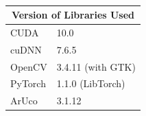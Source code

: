 \begin{table}[h]
    \renewcommand*{\arraystretch}{1.6}
    \centering
    \begin{tabularx}{\textwidth}{Xl}
        \multicolumn{2}{c}{\Large{Version of Libraries Used}} \\
        \toprule
        CUDA    & 10.0                                        \\
        \midrule
        cuDNN   & 7.6.5                                       \\
        \midrule
        OpenCV  & 3.4.11 (with GTK)                           \\
        \midrule
        PyTorch & 1.1.0 (LibTorch)                            \\
        \midrule
        ArUco   & 3.1.12                                      \\
        \bottomrule
    \end{tabularx}
    \caption[Version of Libraries Used]{}
\end{table}